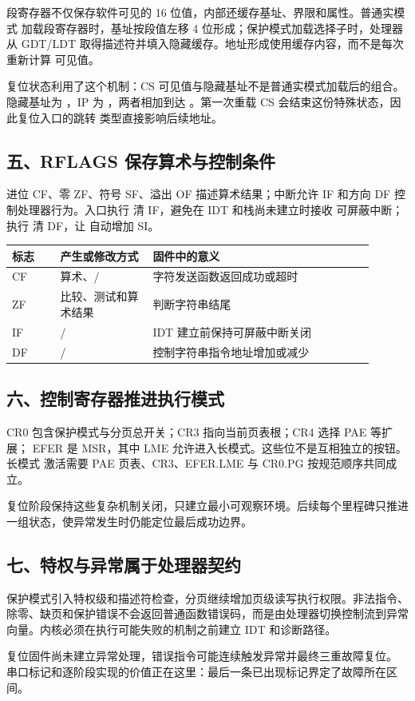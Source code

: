段寄存器不仅保存软件可见的 16 位值，内部还缓存基址、界限和属性。普通实模式
加载段寄存器时，基址按段值左移 4 位形成；保护模式加载选择子时，处理器从
GDT/LDT 取得描述符并填入隐藏缓存。地址形成使用缓存内容，而不是每次重新计算
可见值。

复位状态利用了这个机制：CS 可见值与隐藏基址不是普通实模式加载后的组合。
隐藏基址为 ，IP 为 ，两者相加到达
。第一次重载 CS 会结束这份特殊状态，因此复位入口的跳转
类型直接影响后续地址。

\subsection{五、RFLAGS 保存算术与控制条件}

进位 CF、零 ZF、符号 SF、溢出 OF 描述算术结果；中断允许 IF 和方向 DF
控制处理器行为。入口执行  清 IF，避免在 IDT 和栈尚未建立时接收
可屏蔽中断；执行  清 DF，让  自动增加 SI。

\begin{longtable}{L{0.12\linewidth}L{0.23\linewidth}L{0.55\linewidth}}
\toprule
标志 & 产生或修改方式 & 固件中的意义 \\
\midrule
CF & 算术、/ & 字符发送函数返回成功或超时 \\
ZF & 比较、测试和算术结果 &  判断字符串结尾 \\
IF & / & IDT 建立前保持可屏蔽中断关闭 \\
DF & / & 控制字符串指令地址增加或减少 \\
\bottomrule
\end{longtable}

\subsection{六、控制寄存器推进执行模式}

CR0 包含保护模式与分页总开关；CR3 指向当前页表根；CR4 选择 PAE 等扩展；
EFER 是 MSR，其中 LME 允许进入长模式。这些位不是互相独立的按钮。长模式
激活需要 PAE 页表、CR3、EFER.LME 与 CR0.PG 按规范顺序共同成立。

复位阶段保持这些复杂机制关闭，只建立最小可观察环境。后续每个里程碑只推进
一组状态，使异常发生时仍能定位最后成功边界。

\subsection{七、特权与异常属于处理器契约}

保护模式引入特权级和描述符检查，分页继续增加页级读写执行权限。非法指令、
除零、缺页和保护错误不会返回普通函数错误码，而是由处理器切换控制流到异常
向量。内核必须在执行可能失败的机制之前建立 IDT 和诊断路径。

复位固件尚未建立异常处理，错误指令可能连续触发异常并最终三重故障复位。
串口标记和逐阶段实现的价值正在这里：最后一条已出现标记界定了故障所在区间。
